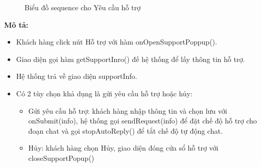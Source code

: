 \begin{figure}[H]
    \centering
     
    \vspace{0.5cm}
    \caption{Biểu đồ sequence cho Yêu cầu hỗ trợ}
    \label{fig:enter-label}
\end{figure}
\textbf{Mô tả: }
\begin{itemize}
	\item Khách hàng click nút Hỗ trợ với hàm onOpenSupportPoppup().
	\item Giao diện gọi hàm getSupportInro() đế hệ thống để lấy thông tin hỗ trợ.
	\item Hệ thống trả về giao diện supportInfo.
	\item Có 2 tùy chọn khả dụng là gửi yêu cầu hỗ trợ hoặc hủy:
	\begin{itemize}
		\item Gửi yêu cầu hỗ trợ: khách hàng nhập thông tin và chọn lưu với onSubmit(info), hệ thống gọi sendRequest(info) để đặt chế độ hỗ trợ cho đoạn chat và gọi stopAutoReply() để tắt chế độ tự động chat.
		\item Hủy: khách hàng chọn Hủy, giao diện đóng cửa sổ hỗ trợ với closeSupportPopup()
	\end{itemize}
\end{itemize}
%      
